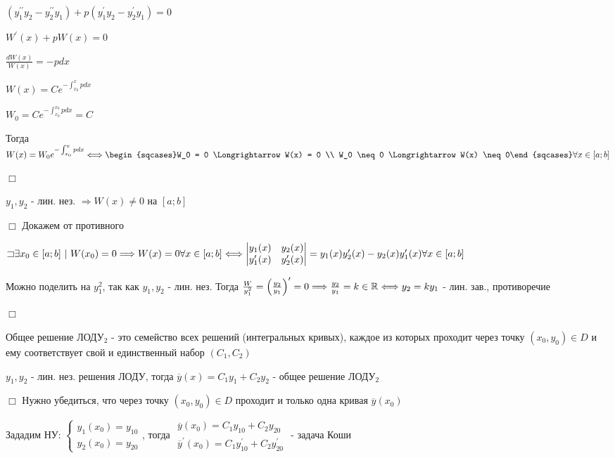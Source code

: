 \documentclass[12pt]{article}
\begin{document}
    $(y_1^{\prime\prime} y_2 - y_2^{\prime\prime} y_1) + p (y_1^{\prime} y_2 - y_2^{\prime} y_1) = 0$

    $W^\prime(x) + pW(x) = 0$

    $\frac{dW(x)}{W(x)} = -pdx$

    $W(x) = Ce^{-\int_{x_0}^x pdx}$

    $W_0 = Ce^{-\int^{x_0}_{x_0} pdx} = C$

    Тогда $W(x) = W_0 e^{-\int_{x_0}^x pdx} \Longleftrightarrow \begin{sqcases}W_0 = 0 \Longrightarrow W(x) = 0 \\ W_0 \neq 0 \Longrightarrow W(x) \neq 0\end{sqcases} \forall x \in [a;b]$

    $\Box$

     $y_1, y_2$ - лин. нез. $\Longrightarrow W(x) \neq 0$ на $[a;b]$

    $\Box$ Докажем от противного

    $\letsymbol \exists x_0 \in [a;b] \ | \ W(x_0)= 0 \Longrightarrow W(x) = 0 \forall x \in [a;b] \Longleftrightarrow
    \begin{vmatrix}y_1(x) & y_2(x) \\ y_1^\prime(x) & y_2^\prime(x)\end{vmatrix} = y_1(x) y_2^\prime(x) - y_2(x) y_1^\prime(x) \forall x \in [a;b]$

    Можно поделить на $y_1^2$, так как $y_1, y_2$ - лин. нез. Тогда $\frac{W}{y^2_1} = \left(\frac{y_2}{y_1}\right)^\prime = 0 \Longrightarrow \frac{y_2}{y_1} = k \in \mathbb{R} \Longleftrightarrow y_2 = k y_1$ - лин. зав., противоречие

    $\Box$

    \Nota Общее решение ЛОДУ$_2$ - это семейство всех решений (интегральных кривых), каждое из которых проходит через точку
    $(x_0, y_0) \in D$ и ему соответствует свой и единственный набор $(C_1, C_2)$

     $y_1, y_2$ - лин. нез. решения ЛОДУ, тогда $\overline{y}(x) = C_1 y_1 + C_2 y_2$ - общее решение ЛОДУ$_2$

    $\Box$ Нужно убедиться, что через точку $(x_0, y_0) \in D$ проходит и только одна кривая $\overline{y}(x_0)$

    Зададим НУ: $\begin{cases}
                     y_1(x_0) = y_{10} \\
                     y_2(x_0) = y_{20}
    \end{cases}$, тогда $\begin{matrix}\overline{y}(x_0) = C_1 y_{10} + C_2 y_{20} \\ \overline{y}^\prime(x_0) = C_1 y_{10}^\prime + C_2 y_{20}^\prime\end{matrix}$ - задача Коши
\end{document}
